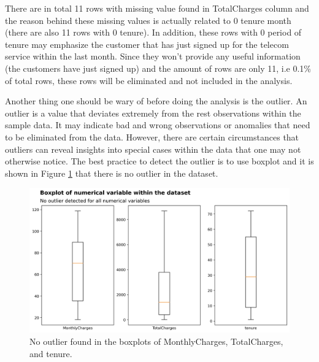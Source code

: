 There are in total 11 rows with missing value found in TotalCharges column and the reason behind these missing values is actually related to 0 tenure month (there are also 11 rows with 0 tenure). In addition, these rows with 0 period of tenure may emphasize the customer that has just signed up for the telecom service within the last month. Since they won't provide any useful information (the customers have just signed up) and the amount of rows are only 11, i.e 0.1\% of total rows, these rows will be eliminated and not included in the analysis.

Another thing one should be wary of before doing the analysis is the outlier.  An outlier is a value that deviates extremely from the rest observations within the sample data.  It may indicate bad and wrong observations or anomalies that need to be eliminated from the data. However, there are certain circumstances that outliers can reveal insights into special cases within the data that one may not otherwise notice. The best practice to detect the outlier is to use boxplot and it is shown in Figure \ref{fig:outlier1} that there is no outlier in the dataset.
\begin{figure}[tbph]
	\centering
	\includegraphics[width=1\linewidth]{figures/outlier1}
	\caption{No outlier found in the boxplots of MonthlyCharges, TotalCharges, and tenure.}
	\label{fig:outlier1}
\end{figure}


